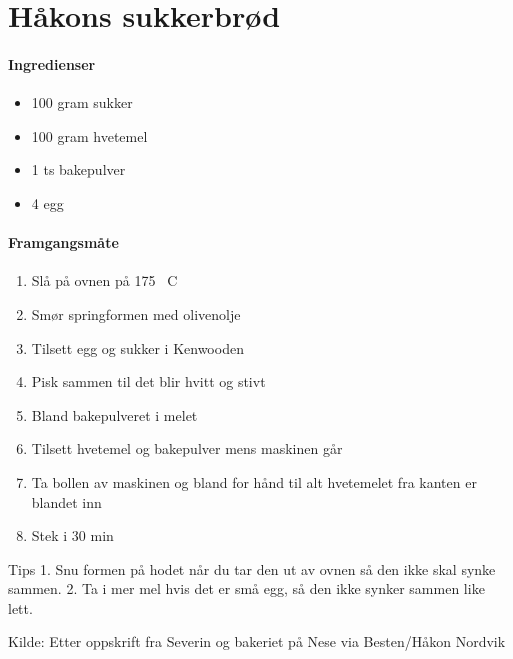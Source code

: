 \section{﻿Håkons sukkerbrød}
\label{sukkerbrod}

\paragraph{Ingredienser}
\begin{itemize}[noitemsep]
	\item 100 gram sukker
	\item 100 gram hvetemel
	\item 1 ts bakepulver
	\item 4 egg
\end{itemize}

\paragraph{Framgangsmåte}
\begin{enumerate}[noitemsep]
	\item Slå på ovnen på 175 \degree~C
	\item Smør springformen med olivenolje
	\item Tilsett egg og sukker i Kenwooden
	\item Pisk sammen til det blir hvitt og stivt
	\item Bland bakepulveret i melet
	\item Tilsett hvetemel og bakepulver mens maskinen går
	\item Ta bollen av maskinen og bland for hånd til alt hvetemelet fra kanten er blandet inn
	\item Stek i 30 min
\end{enumerate}


Tips
1. Snu formen på hodet når du tar den ut av ovnen så den ikke skal synke sammen.
2. Ta i mer mel hvis det er små egg, så den ikke synker sammen like lett.

Kilde: Etter oppskrift fra Severin og bakeriet på Nese via Besten/Håkon Nordvik
